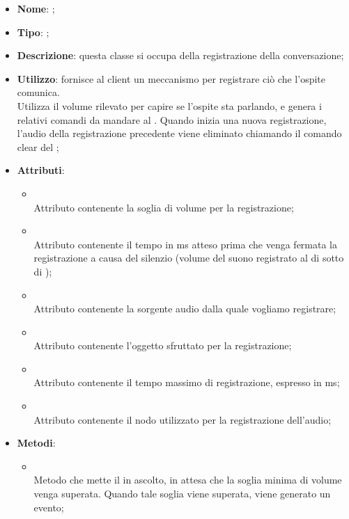 \begin{itemize}
	\item \textbf{Nome}: ;
	\item \textbf{Tipo}: ;
	\item \textbf{Descrizione}: questa classe si occupa della registrazione della conversazione;
	\item \textbf{Utilizzo}: fornisce al client un meccanismo per registrare ciò che l'ospite comunica. \\
	Utilizza il volume rilevato per capire se l'ospite sta parlando, e genera i relativi comandi da mandare al . Quando inizia una nuova registrazione, l'audio della registrazione precedente viene eliminato chiamando il comando clear del ;
	\item \textbf{Attributi}:
	\begin{itemize}
		\item[]  \\
		Attributo contenente la soglia di volume per la registrazione;
		\item[]  \\
		Attributo contenente il tempo in ms atteso prima che venga fermata la registrazione a causa del silenzio (volume del suono registrato al di sotto di );
		\item[]  \\
		Attributo contenente la sorgente audio dalla quale vogliamo registrare;
		\item[]  \\
		Attributo contenente l'oggetto  sfruttato per la registrazione;
		\item[]  \\
		Attributo contenente il tempo massimo di registrazione, espresso in ms;
		\item[]  \\
		Attributo contenente il nodo utilizzato per la registrazione dell'audio;
	\end{itemize}
	\item \textbf{Metodi}:
	\begin{itemize}
		\item[]  \\		Metodo che mette il  in ascolto, in attesa che la soglia minima di volume venga superata. Quando tale soglia viene superata, viene generato un evento;\\

\end{itemize}
\end{itemize}
